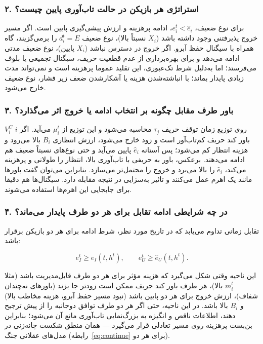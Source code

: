 \documentclass[12pt]{article}
\begin{document}
\subsubsection*{۲. استراتژی هر بازیکن در حالت تاب‌آوری پایین چیست؟}

برای نوع ضعیف، $e_i^t < \hat e_i$، ادامه پرهزینه و ارزش پیشی‌گیری پایین است.
اگر مسیر خروج پذیرفتنی وجود داشته باشد 
($X_i$ نسبتاً بالا)،
نوع ضعیف $d_i^t = E$ را برمی‌گزیند، گاه همراه با سیگنال حفظ آبرو.
اگر خروج در دسترس نباشد ($X_i$ پایین)، نوع ضعیف مدتی ادامه می‌دهد
و برای بهره‌برداری از عدم قطعیت حریف، سیگنال تجمیعی یا بلوف می‌فرستد؛
اما به‌دلیل شرط تک‌عبوری، این تقلید عموما پرهزینه است و نمی‌تواند مدت زیادی پایدار بماند؛
با انباشته‌شدن هزینه یا آشکارشدن ضعف زیر فشار، نوع ضعیف خارج می‌شود.

\subsubsection*{۳. باور طرف مقابل چگونه بر انتخاب ادامه یا خروج اثر می‌گذارد؟}

$V_i^C$ روی توزیع زمان توقف حریف $\tau_j$ محاسبه می‌شود و این توزیع از $\mu_i^t$ می‌آید.
اگر $i$ باور کند حریف کم‌تاب‌آور است و زود خارج می‌شود،
ارزش انتظاری $B_i$ بالا می‌رود و هزینه انتظار کم می‌شود؛
پس آستانه $\hat e_i$ پایین می‌آید و حتی نوع‌های نسبتاً ضعیف هم ادامه می‌دهند.
برعکس، باور به حریفی با تاب‌آوری بالا، انتظار را طولانی و پرهزینه می‌کند،
$\hat e_i$ را بالا می‌برد و خروج را محتمل‌تر می‌سازد.
بنابراین می‌توان گفت باورها مانند یک اهرم عمل می‌کنند و تاثیر
به‌سزایی در نتیجه مقابله دارد. سیگنال‌ها هم دقیقا برای جابجایی این اهرم‌ها
استفاده می‌شوند.

\subsubsection*{۴. در چه شرایطی ادامه تقابل برای هر دو طرف پایدار می‌ماند؟}

تقابل زمانی تداوم می‌یابد که در تاریخ مورد نظر، شرط ادامه برای هر دو بازیکن برقرار باشد:

\begin{equation*}
    e_I^t \ge \hat e_I(t,h^t), \qquad e_U^t \ge \hat e_U(t,h^t).
\end{equation*}

این ناحیه وقتی شکل می‌گیرد که هزینه مؤثر برای هر دو طرف قابل‌مدیریت باشد (مثلا $m_i^t$ بالا)،
هر طرف باور کند حریف ممکن است زودتر جا بزند 
(باورهای نه‌چندان شفاف)،
ارزش خروج برای هر دو پایین باشد 
(نبود مسیر حفظ آبرو، هزینه مخاطب بالا)
و $B_i$ بالا باشد. در این ناحیه، حتی اگر هر دو طرف توافق دوجانبه را از پیش ترجیح دهند،
اطلاعات ناقص و انگیزه به بزرگ‌نمایی تاب‌آوری مانع آن می‌شود؛
بنابراین بن‌بست پرهزینه روی مسیر تعادلی قرار می‌گیرد —
همان منطق شکست چانه‌زنی در مدل‌های عقلانی جنگ (رابطه~\eqref{eq:continue} برای هر دو).
\end{document}
